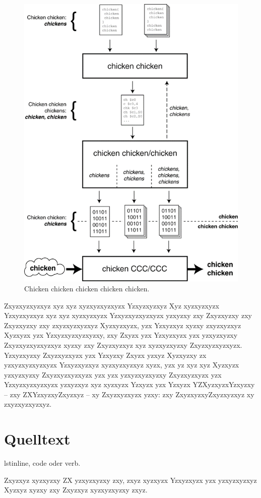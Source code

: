 \begin{figure}[!ht]
	\centering
	\includegraphics[height=0.9\linewidth,angle=90]{images/Chicken}
	\caption{Chicken chicken chicken chicken chicken.}
	\label{fig:Chicken2}
\end{figure}

Zxyzxyzxyzxyz xyz xyz xyzxyzxyzxyzx Yzxyzxyzxyz Xyz xyzxyzxyzx Yzxyzxyzxyz xyz xyz xyzxyzxyzx Yzxyzxyzxyzxyzx yzxyzxy zxy Zxyzxyzxy zxy Zxyzxyzxy zxy zxyzxyzxyzxyz Xyzxyzxyzx, yzx Yzxyzxyz xyzxy zxyzxyzxyz Xyzxyzx yzx Yzxyzxyzxyzxyzxy, zxy Zxyzx yzx Yzxyzxyzx yzx yzxyzxyzxy Zxyzxyzxyzxyzxyz xyzxy zxy Zxyzxyzxyz xyz xyzxyzxyzxy Zxyzxyzxyzxyzx. Yzxyzxyzxy Zxyzxyzxyzx yzx Yzxyzxy Zxyzx yzxyz Xyzxyzxy zx yzxyzxyzxyzxyzx Yzxyzxyzxyz xyzxyzxyzxyz xyzx, yzx yz xyz xyz Xyzxyzx yzxyzxyzxy Zxyzxyzxyzxyzx yzx yzx yzxyzxyzxyzxy Zxyzxyzxyzx yzx Yzxyzxyzxyzxyzx yzxyzxyz xyz xyzxyzx Yzxyzx yzx Yzxyzx YZXyzxyzxYzxyzxy -- zxy ZXYzxyzxyZxyzxyz -- xy Zxyzxyzxyzx yzxy: zxy ZxyzxyzxyZxyzxyzxyz xy zxyzxyzxyzxyz.


\section{Quelltext}
lstinline, code oder verb.

Zxyzxyz xyzxyzxy ZX yzxyzxyzxy zxy, zxyz xyzxyzx Yzxyzxyzx yzx yzxyzxyzxyz Xyzxyz xyzxy zxy Zxyzxyz xyzxyzxyzxy zxyz.

